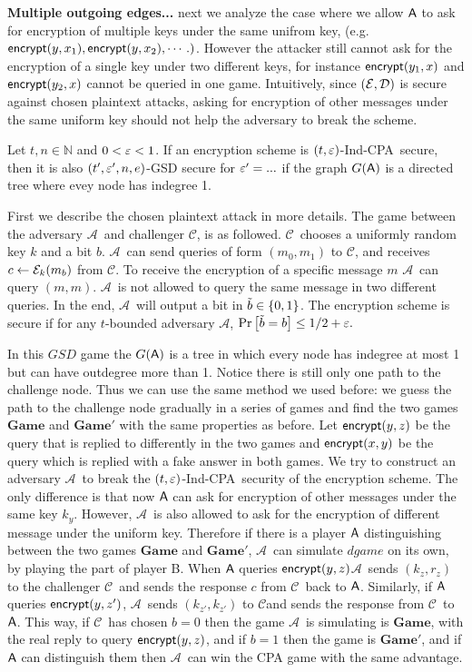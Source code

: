 \documentclass{article}
\newcommand{\tcpa}{$(t,\eps)$-Ind-CPA}
\def\B{{\sf B}}
\def\A{{\sf A}}
\def\E{{\cal E}}
\def\D{{\cal D}}
\def\a {${\mathcal A}$}
\def\ch {${\mathcal C}$}
\newcommand{\encrypt}{{\sf encrypt}}
\newcommand{\dgame}{{\mathbf{Game}}}
\begin{document}
\textbf{Multiple outgoing edges...} next we analyze the case where we allow $\A$ to ask for encryption of multiple keys under the same unifrom key, (e.g. $\encrypt(y,x_1), \encrypt(y,x_2), \cdots.)$. However the attacker still cannot ask for the encryption of a single key under two different keys, for instance $\encrypt(y_1,x)$ and$ \encrypt(y_2,x)$ cannot be queried in one game. Intuitively, since $(\E,\D)$ is secure against chosen plaintext attacks, asking for encryption of other messages under the same uniform key should not help the adversary to break the scheme. 

\begin{theorem}
Let $t,n \in \mathbb{N}$  and $0<\varepsilon<1$. If an encryption scheme is \tcpa~secure, then it is also $(t',\varepsilon',n,e)$-GSD secure for $\varepsilon'= ...$ if the graph $G(\A)$ is a directed tree where evey node has indegree 1. 
\end{theorem}

First we describe the chosen plaintext attack in more details. The game between the adversary \a~and challenger \ch, is as followed. \ch~chooses a uniformly random key $k$ and a bit $b$. \a~can send queries of form $(m_0,m_1)$ to \ch, and receives $c\leftarrow \E_k(m_b)$ from \ch. To receive the encryption of a specific message $m$ \a~can query $(m,m)$. \a~is not allowed to query the same message in two different queries. In the end, \a~will output a bit in $\tilde{b}\in \{0,1\}$. The encryption scheme is secure if for any $t$-bounded adversary \a, $\Pr \left[ \tilde{b}=b \right] \leq 1/2+\varepsilon.$

 In this $GSD$ game the $G(\A)$ is a tree in which every node has indegree at most 1 but can have outdegree more than 1. Notice there is still only one path to the challenge node. Thus we can use the same method we used before: we guess the path to the challenge node gradually in a series of games and find the two games $\dgame$ and $\dgame'$ with the same properties as before. Let $\encrypt(y,z)$ be the query that is replied to differently in the two games and $\encrypt(x,y)$ be the query which is replied with a fake answer in both games. We try to construct an adversary \a~to break the \tcpa~security of the encryption scheme. The only difference is that now $\A$ can ask for encryption of other messages under the same key $k_y$. However, \a~is also allowed to ask for the encryption of different message under the uniform key. Therefore if there is a player $\A$ distinguishing between the two games $\dgame$ and $\dgame'$, \a~can simulate $dgame$ on its own, by playing the part of player \B. When $\A$ queries $\encrypt(y,z)$\a~sends $(k_z,r_z)$ to the challenger \ch~and sends the response $c$ from \ch~back to $\A$. Similarly, if $\A$ queries $\encrypt(y,z')$, \a~sends $(k_{z'},k_{z'})$ to \ch and sends the response from \ch~to $\A$. This way, if \ch~has chosen $b=0$ then the game \a~is simulating is $\dgame$, with the real reply to query $\encrypt(y,z)$, and if $b=1$ then the game is $\dgame'$, and if $\A$ can distinguish them then \a~can win the CPA game with the same advantage.
\end{document}
